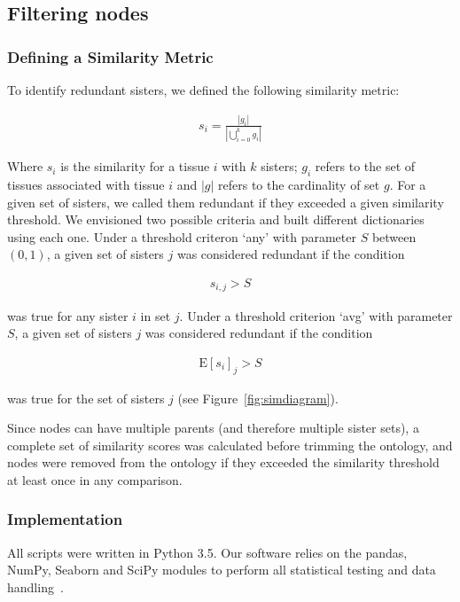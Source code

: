 \subsection*{Filtering nodes}
\subsubsection*{Defining a Similarity Metric}
To identify redundant sisters, we defined the following similarity metric:

\begin{eqnarray}
  \label{similarity def}
	s_i = \frac{|g_i|}{|\bigcup_{i= 0}^k g_i|}
\end{eqnarray}

Where $s_i$ is the similarity for a tissue $i$ with $k$ sisters; $g_i$ refers to
the set of tissues associated with tissue $i$ and $|g|$ refers to the
cardinality of set $g$. For a given set of sisters, we called them redundant if
they exceeded a given similarity threshold. We envisioned two possible criteria
and built different dictionaries using each one. Under a threshold criteron
`any' with parameter $S$ between $(0, 1)$, a given set of sisters $j$ was
considered redundant if the condition

\begin{eqnarray}
  \label{anythreshold}
	s_{i, j} > S
\end{eqnarray}

was true for any sister $i$ in set $j$. Under a threshold criterion `avg' with
parameter $S$, a given set of sisters $j$ was considered redundant if the
condition

\begin{eqnarray}
  \label{avgthreshold}
	\mathrm{E}[s_i]_{j} > S
\end{eqnarray}

was true for the set of sisters $j$ (see Figure~\ref{fig:simdiagram}).

Since nodes can have multiple parents (and therefore multiple sister sets), a
complete set of similarity scores was calculated before trimming the ontology,
and nodes were removed from the ontology if they exceeded the similarity
threshold at least once in any comparison.

\subsubsection*{Implementation}
All scripts were written in Python 3.5. Our software relies on the pandas, NumPy,
Seaborn and SciPy modules to perform all statistical testing and data
handling~\citep{McKinney2011, VanDerWalt2011, Oliphant2007}.


